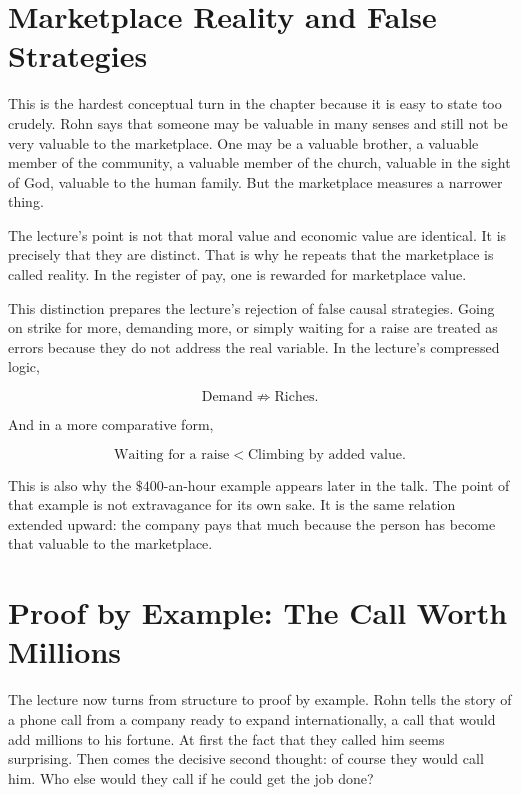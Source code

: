 \section{Marketplace Reality and False Strategies}

This is the hardest conceptual turn in the chapter because it is easy to state too crudely. Rohn says that someone may be valuable in many senses and still not be very valuable to the marketplace. One may be a valuable brother, a valuable member of the community, a valuable member of the church, valuable in the sight of God, valuable to the human family. But the marketplace measures a narrower thing.

The lecture's point is not that moral value and economic value are identical. It is precisely that they are distinct. That is why he repeats that the marketplace is called reality. In the register of pay, one is rewarded for marketplace value.

This distinction prepares the lecture's rejection of false causal strategies. Going on strike for more, demanding more, or simply waiting for a raise are treated as errors because they do not address the real variable. In the lecture's compressed logic,

\begin{equation}
\text{Demand} \not\Longrightarrow \text{Riches}.
\end{equation}

And in a more comparative form,

\begin{equation}
\text{Waiting for a raise} < \text{Climbing by added value}.
\end{equation}

This is also why the \(\$400\)-an-hour example appears later in the talk. The point of that example is not extravagance for its own sake. It is the same relation extended upward: the company pays that much because the person has become that valuable to the marketplace.

\section{Proof by Example: The Call Worth Millions}

The lecture now turns from structure to proof by example. Rohn tells the story of a phone call from a company ready to expand internationally, a call that would add millions to his fortune. At first the fact that they called him seems surprising. Then comes the decisive second thought: of course they would call him. Who else would they call if he could get the job done?

